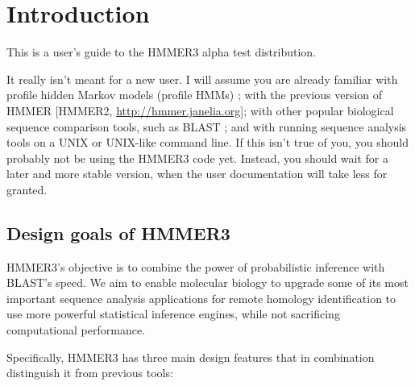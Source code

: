 \section{Introduction}

This is a user's guide to the HMMER3 alpha test distribution. 

It really isn't meant for a new user. I will assume you are already
familiar with profile hidden Markov models (profile HMMs)
\citep{Krogh94,Eddy98,Durbin98}; with the previous version of HMMER
[HMMER2, \url{http://hmmer.janelia.org}]; with other popular
biological sequence comparison tools, such as BLAST
\citep{Altschul97}; and with running sequence analysis tools on a UNIX
or UNIX-like command line. If this isn't true of you, you should
probably not be using the HMMER3 code yet. Instead, you should wait
for a later and more stable version, when the user documentation will
take less for granted.

\subsection{Design goals of HMMER3}

HMMER3's objective is to combine the power of probabilistic inference
with BLAST's speed. We aim to enable molecular biology to upgrade some
of its most important sequence analysis applications for remote
homology identification to use more powerful statistical inference
engines, while not sacrificing computational performance.

Specifically, HMMER3 has three main design features that in
combination distinguish it from previous tools:

